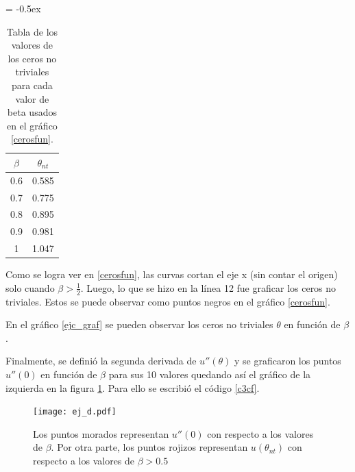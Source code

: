 \documentclass[../portafolio.tex]{subfiles}
\begin{document}
{
\extrarowheight = -0.5ex
\renewcommand{\arraystretch}{1.75}

\begin{table}
    \centering
    \begin{tabular}{c|c}
        $\beta$  & $\theta_{nt}$ \\ \hline
        0.6 & 0.585 \\
        0.7 & 0.775 \\
        0.8 & 0.895\\
        0.9 & 0.981\\
        1 &  1.047
    \end{tabular}
    \caption{Tabla de los valores de los ceros no triviales para cada valor de beta usados en el gráfico \ref{cerosfun}.}
    \label{bvstnt}
 \end{table}   

} 

Como se logra ver en \ref{cerosfun}, las curvas cortan el eje x (sin contar el origen) solo cuando $\beta>\frac{1}{2}$.
Luego, lo  que se hizo en la línea 12 fue graficar los ceros no triviales. Estos se puede observar como puntos negros en el gráfico \ref{cerosfun}. 

En el gráfico \ref{ejc_graf} se pueden observar los ceros no triviales $\theta$ en función de $\beta$.





Finalmente, se definió la segunda derivada de $u''(\theta)$ y se graficaron los puntos $u''(0)$ en función de $\beta$ para sus 10 valores quedando así el gráfico de la izquierda en la figura \ref{cerosd}. Para ello se escribió el código \ref{c3cf}.

\begin{figure}[H]
    \centering
    \texttt{[image: ej\_d.pdf]}
    \caption{Los puntos morados representan $u''(0)$ con respecto a los valores de $\beta$. Por otra parte, los puntos rojizos representan $u(\theta_{nt})$ con respecto a los valores de $\beta>0.5$}
    \label{cerosd}
\end{figure}

\end{document}
